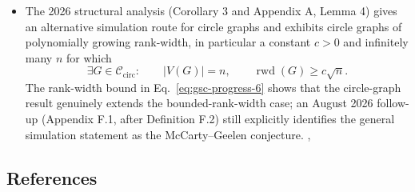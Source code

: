 \begin{itemize}
  \item The 2026 structural analysis (Corollary 3 and Appendix A, Lemma 4) gives an alternative simulation route for circle graphs and exhibits circle graphs of polynomially growing rank-width, in particular a constant $c>0$ and infinitely many $n$ for which
  \begin{equation}
\exists G\in\mathcal C_{\mathrm{circ}}:
  \qquad |V(G)|=n,
  \qquad \operatorname{rwd}(G)\geq c\sqrt n.
\label{eq:gsc-progress-6}
\end{equation}
  The rank-width bound in Eq.~\eqref{eq:gsc-progress-6} shows that the circle-graph result genuinely extends the bounded-rank-width case; an August 2026 follow-up (Appendix F.1, after Definition F.2) still explicitly identifies the general simulation statement as the McCarty–Geelen conjecture. , 
\end{itemize}

\subsection*{References}

